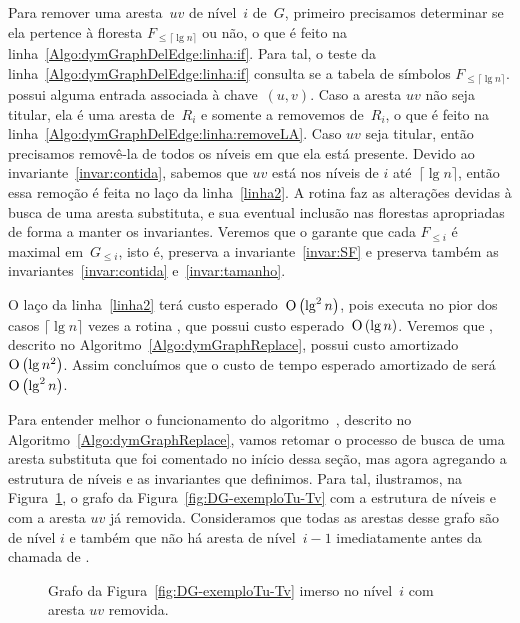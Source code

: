 Para remover uma aresta~$uv$ de nível~$i$ de~$G$, primeiro precisamos determinar se ela pertence à floresta $F_{\leqslant\lceil \lg n \rceil}$ ou não, o que é feito na linha~\ref{Algo:dymGraphDelEdge:linha:if}. Para tal, o teste da linha~\ref{Algo:dymGraphDelEdge:linha:if} consulta se a tabela de símbolos $F_{\leqslant\lceil \lg n \rceil}$.\dymForestHash{} possui alguma entrada associada à chave~$(u,v)$. Caso a aresta $uv$ não seja titular, 
ela é uma aresta de~$R_i$ e somente a removemos de~$R_i$, o que é feito na linha~\ref{Algo:dymGraphDelEdge:linha:removeLA}.
Caso $uv$ seja titular, então precisamos removê-la de todos os níveis em que ela está presente.  Devido ao invariante~\ref{invar:contida}, sabemos que $uv$ está nos níveis de $i$ até~$\lceil \lg n \rceil$, então essa remoção é feita no laço da linha~\ref{linha2}.  
A rotina \dymGraphReplace{} faz as alterações devidas à busca de uma aresta substituta, e sua eventual inclusão nas florestas apropriadas de forma a manter os invariantes.
Veremos que o \dymGraphReplace{} garante que cada $F_{\leqslant i}$ é maximal em~$G_{\leqslant i}$, isto é, preserva a invariante~\ref{invar:SF} e preserva também as invariantes~\ref{invar:contida} e~\ref{invar:tamanho}.

O laço da linha~\ref{linha2} terá custo esperado~$\text{O}\left(\lg^2 n\right)$, pois executa no pior dos casos $\lceil \lg n \rceil$ vezes a rotina \dymForestDelEdge{}, que possui custo esperado~$\text{O}\left(\lg n\right)$. Veremos que \dymGraphReplace{}, descrito no Algoritmo~\ref{Algo:dymGraphReplace}, possui custo amortizado~$\text{O}\left(\lg n^2\right)$. Assim concluímos que o custo de tempo esperado amortizado de \dymGraphDelEdge{} será~$\text{O}\left(\lg^2 n\right)$.

\medskip

Para entender melhor o funcionamento do algoritmo~\dymGraphReplace{}, descrito no Algoritmo~\ref{Algo:dymGraphReplace}, vamos retomar o processo de busca de uma aresta substituta que foi comentado no início dessa seção, mas agora agregando a estrutura de níveis e as invariantes que definimos. Para tal, ilustramos, na Figura~\ref{fig:DG-antes-de-rebaixar}, o grafo da Figura~\ref{fig:DG-exemploTu-Tv} com a estrutura de níveis e com a aresta $uv$ já removida. Consideramos que todas as arestas desse grafo são de nível $i$ e também que não há aresta de nível~$i-1$ imediatamente antes da chamada de \dymGraphReplace{}.
\begin{figure}[htb]
\centering
\caption{Grafo da Figura~\ref{fig:DG-exemploTu-Tv} imerso no nível~$i$ com aresta $uv$ removida.}
\label{fig:DG-antes-de-rebaixar}
\end{figure}

